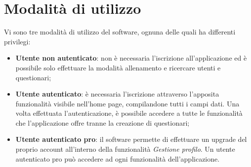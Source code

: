 \newpage
\section{Modalità di utilizzo}
Vi sono tre modalità di utilizzo del software, ognuna delle quali ha differenti privilegi:
\begin{itemize}
	\item \textbf{Utente non autenticato}: non è necessaria l'iscrizione all'applicazione ed è possibile solo effettuare la modalità allenamento e ricercare utenti e questionari;
	\item \textbf{Utente autenticato}: è necessaria l'iscrizione attraverso l'apposita funzionalità visibile nell'home page, compilandone tutti i campi dati. Una volta effettuata l'autenticazione, è possibile accedere a tutte le funzionalità che l'applicazione offre tranne la creazione di questionari;
	\item \textbf{Utente autenticato pro}: il software permette di effettuare un upgrade del proprio account all'interno della funzionalità \textit{Gestione profilo}. Un utente autenticato pro può accedere ad ogni funzionalità dell'applicazione. 
\end{itemize}
